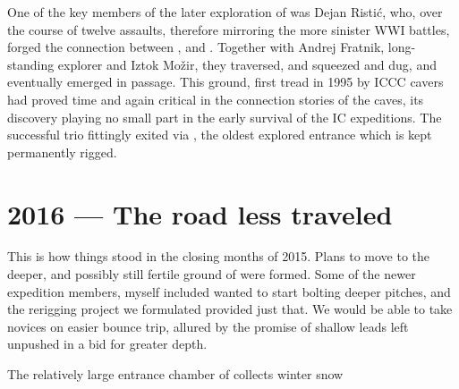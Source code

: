 One of the key members of the later exploration of  was Dejan Ristić, who, over the course of twelve assaults, therefore mirroring the more sinister WWI  battles, forged the connection between , and . Together with Andrej Fratnik, long-standing  explorer and Iztok Možir, they traversed, and squeezed and dug, and eventually emerged in  passage. This ground, first tread in 1995 by ICCC cavers had proved time and again critical in the connection stories of the  caves, its discovery playing no small part in the early survival of the IC expeditions. The successful trio fittingly exited via , the oldest explored entrance which is kept permanently rigged.


\section{2016 --- The road less traveled}
This is how things stood in the closing months of 2015. Plans to move to the deeper, and possibly still fertile ground of  were formed. Some of the newer expedition members, myself included wanted to start bolting deeper pitches, and the rerigging project we formulated provided just that. We would be able to take novices on easier bounce trip, allured by the promise of shallow leads left unpushed in a bid for greater depth.

\begin{marginfigure}
\checkoddpage \ifoddpage \forcerectofloat \else \forceversofloat \fi
	\centering
  	\caption{The relatively large entrance chamber of \protect{} collects winter snow }
	\end{marginfigure}

